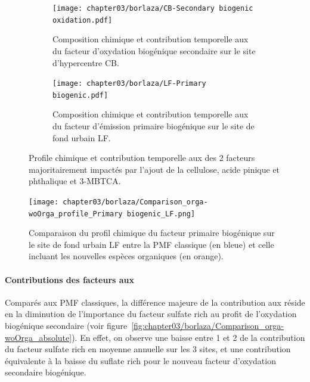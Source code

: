 \begin{figure}[ht]
    \centering
    \begin{subfigure}[t]{1\textwidth}
    \begin{center}
        \texttt{[image: chapter03/borlaza/CB-Secondary biogenic oxidation.pdf]}
    \end{center}
    \caption{Composition chimique et contribution temporelle aux \PMdix{} du facteur
    d'oxydation biogénique secondaire sur le site d'hypercentre CB.}%
    \label{fig:chapter03/borlaza/CB-SBO}
    \end{subfigure}
    \begin{subfigure}[t]{1\textwidth}
    \begin{center}
        \texttt{[image: chapter03/borlaza/LF-Primary biogenic.pdf]}
    \end{center}
    \caption{Composition chimique et contribution temporelle aux \PMdix{} du facteur
    d'émission primaire biogénique sur le site de fond urbain LF.}%
    \label{fig:chapter03/borlaza/LF-PBOA}
    \end{subfigure}
    \caption{Profile chimique et contribution temporelle aux \PMdix{} des 2 facteurs
        majoritairement impactés par l'ajout de la cellulose, acide pinique et phthalique
        et 3-MBTCA.
    }%
    \label{fig:chapter03/borlaza/pmf_profiles}
\end{figure}

\begin{figure}[ht]
    \centering
    \texttt{[image: chapter03/borlaza/Comparison\_orga-woOrga\_profile\_Primary biogenic\_LF.png]}
    \caption{Comparaison du profil chimique du facteur primaire biogénique sur le site de
        fond urbain LF entre la PMF classique (en bleue) et celle incluant les nouvelles
    espèces organiques (en orange).}%
    \label{fig:chapter03/borlaza/comparaison-classique-orga}
\end{figure}

\paragraph{Contributions des facteurs aux \PMdix}%
\label{par:contributions_des_facteurs_aux_pmdix}

Comparés aux PMF classiques, la différence majeure de la contribution aux \PMdix{} réside
en la diminution de l'importance du facteur sulfate rich au profit de l'oxydation
biogénique secondaire (voir
figure~\ref{fig:chapter03/borlaza/Comparison_orga-woOrga_absolute}).  En effet, on
observe une baisse entre \SI{1}{\ugm} et \SI{2}{\ugm} de la contribution du facteur
sulfate rich en moyenne annuelle sur les 3 sites, et une contribution équivalente à la
baisse du suflate rich pour le nouveau facteur d'oxydation secondaire biogénique.


